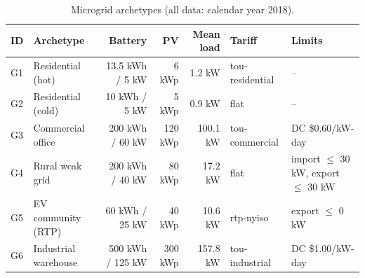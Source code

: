 \begin{table}[t]\centering\small
\caption{Microgrid archetypes (all data: calendar year 2018).}\label{tab:grids}
\begin{tabular}{llrrrll}
\toprule
ID & Archetype & Battery & PV & Mean load & Tariff & Limits \\
\midrule
G1 & Residential (hot) & 13.5 kWh / 5 kW & 6 kWp & 1.2 kW & tou-residential & -- \\
G2 & Residential (cold) & 10 kWh / 5 kW & 5 kWp & 0.9 kW & flat & -- \\
G3 & Commercial office & 200 kWh / 60 kW & 120 kWp & 100.1 kW & tou-commercial & DC \$0.60/kW-day \\
G4 & Rural weak grid & 200 kWh / 40 kW & 80 kWp & 17.2 kW & flat & import $\le$ 30 kW, export $\le$ 30 kW \\
G5 & EV community (RTP) & 60 kWh / 25 kW & 40 kWp & 10.6 kW & rtp-nyiso & export $\le$ 0 kW \\
G6 & Industrial warehouse & 500 kWh / 125 kW & 300 kWp & 157.8 kW & tou-industrial & DC \$1.00/kW-day \\
\bottomrule
\end{tabular}
\end{table}